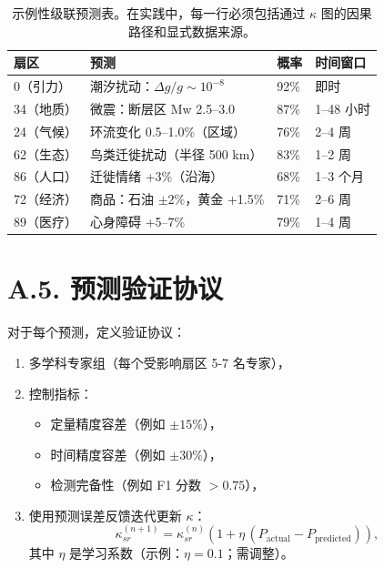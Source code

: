 \documentclass[11pt,a4paper]{article}
\begin{document}
	\begin{table}[htbp]
		\centering
		\small
		\begin{tabular}{p{}p{}p{}p{}}
			\toprule
			\textbf{扇区} & \textbf{预测} & \textbf{概率} & \textbf{时间窗口} \\
			\midrule
			0（引力） & 潮汐扰动：$\Delta g/g \sim 10^{-8}$ & 92\% & 即时 \\
			34（地质） & 微震：断层区 Mw 2.5--3.0 & 87\% & 1--48 小时 \\
			24（气候） & 环流变化 0.5--1.0\%（区域） & 76\% & 2--4 周 \\
			62（生态） & 鸟类迁徙扰动（半径 500 km） & 83\% & 1--2 周 \\
			86（人口） & 迁徙情绪 +3\%（沿海） & 68\% & 1--3 个月 \\
			72（经济） & 商品：石油 $\pm 2\%$，黄金 +1.5\% & 71\% & 2--6 周 \\
			89（医疗） & 心身障碍 +5--7\% & 79\% & 1--4 周 \\
			\bottomrule
		\end{tabular}
		\caption{示例性级联预测表。在实践中，每一行必须包括通过 $\kappa$ 图的因果路径和显式数据来源。}
	\end{table}
	
	\section*{A.5. 预测验证协议}
	
	对于每个预测，定义验证协议：
	\begin{enumerate}[leftmargin=*]
		\item 多学科专家组（每个受影响扇区 5-7 名专家），
		\item 控制指标：
		\begin{itemize}[leftmargin=*]
			\item 定量精度容差（例如 $\pm 15\%$），
			\item 时间精度容差（例如 $\pm 30\%$），
			\item 检测完备性（例如 F1 分数 $>0.75$），
		\end{itemize}
		\item 使用预测误差反馈迭代更新 $\kappa$：
		\[
		\kappa_{sr}^{(n+1)}=\kappa_{sr}^{(n)}\left(1+\eta\,(P_{\mathrm{actual}}-P_{\mathrm{predicted}})\right),
		\]
		其中 $\eta$ 是学习系数（示例：$\eta=0.1$；需调整）。
	\end{enumerate}
	
\end{document}
